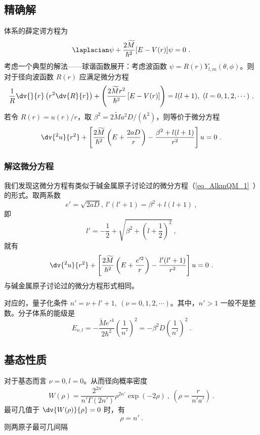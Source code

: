 \subsection{精确解}
体系的薛定谔方程为
\begin{equation}
\laplacian \psi + \frac{2 \widetilde M}{\hbar^2} [E - V(r)] \psi = 0~.
\end{equation}
考虑一个典型的解法——球谐函数展开：考虑波函数 $\psi = R(r) Y_{l, m} (\theta, \phi)$。则对于径向波函数 $R(r)$ 应满足微分方程
\begin{equation}
\frac1R \dv{}{r}\left(r^2 \dv{R}{r}\right) + \left( \frac{2\widetilde M r^2}{\hbar^2} \left[E-V(r)\right] \right) = l(l+1), \ (l = 0, 1, 2, \cdots) ~.
\end{equation}
若令 $R(r) = u(r)/r$，取 $\beta^2=2\widetilde M a^2 D/(\hbar^2)$，则等价于微分方程
\begin{equation}
\dv{^2 u}{r^2} + \left[\frac{2\widetilde M}{\hbar^2} \left(E + \frac{2aD}{r}\right) - \frac{\beta^2 + l(l+1)}{r^2}\right] u = 0 ~.
\end{equation}

\subsubsection{解这微分方程}
我们发现这微分方程有类似于碱金属原子讨论过的微分方程（\autoref{eq_AlkmQM_1}~）的形式。取两系数
\begin{equation}
e' = \sqrt{2aD},\ l'(l'+1) = \beta^2 + l(l+1) ~,
\end{equation}
即
$$l' = -\frac12 + \sqrt{\beta^2 + \left(l + \frac12\right)^2} ~,$$
就有
\begin{equation}
\dv{^2 u}{r^2} + \left[ \frac{2 \widetilde M}{\hbar^2} \left(E + \frac{e'^2}{r}\right)  - \frac{l'(l'+1)}{r^2}\right] u = 0 ~.
\end{equation}
与碱金属原子讨论过的微分方程形式相同。

对应的，量子化条件 $n' = \nu + l' + 1, \ (\nu = 0, 1, 2, \cdots)$。其中，$n' > 1$ 一般不是整数。分子体系的能级是
\begin{equation}
E_{\nu, l} = -\frac{\widetilde M e'^4}{2 \hbar^2} \left(\frac1{n'}\right)^2 = -\beta^2 D \left(\frac{1}{n'}\right)^2 ~.
\end{equation}

\subsection{基态性质}
对于基态而言 $\nu=0, l=0$。从而径向概率密度
\begin{equation}
W(\rho) = \frac{2^{2n'}}{n' \Gamma{(2n')}} \rho^{2n'} \exp(-2\rho) ~, \ \left(\rho = \frac{r}{n'a'}\right) ~.
\end{equation}
最可几值于 $\dv{W(\rho)}{\rho} = 0$ 时，有
\begin{equation}
\rho = n' ~.
\end{equation}
则两原子最可几间隔 $$